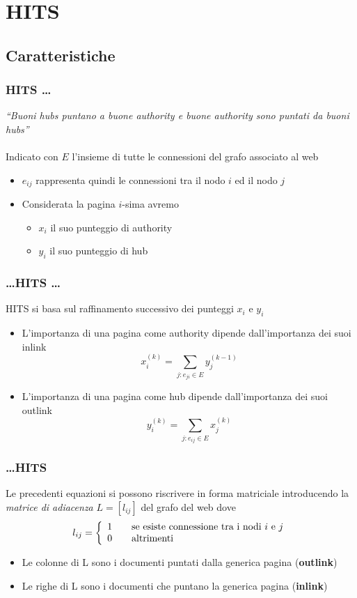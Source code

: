 \documentclass{beamer}
\begin{document}
\section{HITS}
\subsection{Caratteristiche}
\begin{frame}
	\frametitle{HITS \dots}
	\emph{``Buoni hubs puntano a buone authority e buone authority sono puntati da buoni hubs''}\\~\\
	Indicato con $E$ l'insieme di tutte le connessioni del grafo associato al web
	\begin{itemize}
		\item $e_{ij}$ rappresenta quindi le connessioni tra il nodo $i$ ed il nodo $j$
		\item Considerata la pagina $i$-sima avremo
		\begin{itemize}
			\item $x_i$ il suo punteggio di authority
			\item $y_i$ il suo punteggio di hub
		\end{itemize}
	\end{itemize}
\end{frame}
\begin{frame}
	\frametitle{\dots HITS \dots}
	HITS si basa sul raffinamento successivo dei punteggi $x_i$ e $y_i$
	\begin{itemize}
		\item L'importanza di una pagina come authority dipende dall'importanza dei suoi inlink $$x_i^{(k)}=\sum_{j:e_{ji}\in E}y_j^{(k-1)}$$
		\item L'importanza di una pagina come hub dipende dall'importanza dei suoi outlink $$y_i^{(k)}=\sum_{j:e_{ij}\in E}x_j^{(k)}$$
	\end{itemize}
\end{frame}
\begin{frame}
	\frametitle{\dots HITS}
	Le precedenti equazioni si possono riscrivere in forma matriciale introducendo la \emph{matrice di adiacenza} $L=[l_{ij}]$ del grafo del web dove
	\[ l_{ij} = \left\{ 
	\begin{array}{l l}
	1 & \quad \text{se esiste connessione tra i nodi $i$ e $j$}\\
	0 & \quad \text{altrimenti}
	\end{array} \right.\]
	\begin{itemize}
		\item Le colonne di L sono i documenti puntati dalla generica pagina (\textbf{outlink})
		\item Le righe di L sono i documenti che puntano la generica pagina (\textbf{inlink})
	\end{itemize}
\end{frame}
\end{document}

